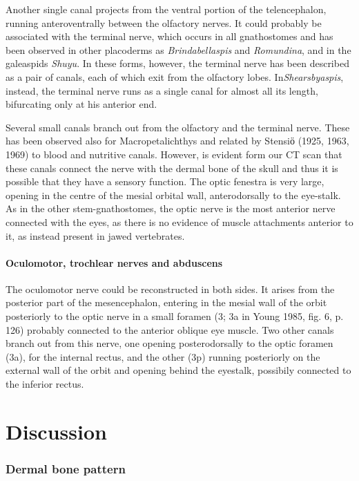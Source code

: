 \documentclass[12pt,letterpaper]{article}
\begin{document}
Another single canal projects from the ventral portion of the telencephalon, running anteroventrally between the olfactory nerves. It could probably be associated with the terminal nerve, which occurs in all gnathostomes and has been observed in other placoderms as \textit{Brindabellaspis} and \textit{Romundina}, and in the galeaspids \textit{Shuyu}. In these forms, however, the terminal nerve has been described as a pair of canals, each of which exit from the olfactory lobes. In\textit{Shearsbyaspis}, instead, the terminal nerve runs as a single canal for almost all its length, bifurcating only at his anterior end.

Several small canals branch out from the olfactory and the terminal nerve. These has been observed also for Macropetalichthys and related by Stensiӧ (1925, 1963, 1969) to blood and nutritive canals. However, is evident form our CT scan that these canals connect the nerve with the dermal bone of the skull and thus it is possible that they have a sensory function.
The optic fenestra is very large, opening in the centre of the mesial orbital wall, anterodorsally to the eye-stalk. As in the other stem-gnathostomes, the optic nerve is the most anterior nerve connected with the eyes, as there is no evidence of muscle attachments anterior to it, as instead present in jawed vertebrates.

\paragraph{Oculomotor, trochlear nerves and abduscens}

The oculomotor nerve could be reconstructed in both sides. It arises from the posterior part of the mesencephalon, entering in the mesial wall of the orbit posteriorly to the optic nerve in a small foramen (3; 3a in Young 1985, fig. 6, p. 126) probably connected to the anterior oblique eye muscle. Two other canals branch out from this nerve, one opening posterodorsally to the optic foramen (3a), for the internal rectus, and the other (3p) running posteriorly on the external wall of the orbit and opening behind the eyestalk, possibily connected to the inferior rectus.

\section{Discussion}

\subsubsection{Dermal bone pattern}
\end{document}
